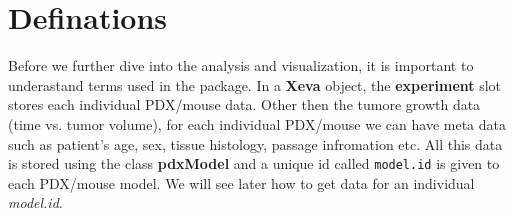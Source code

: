 \documentclass{article}\usepackage[]{graphicx}\usepackage[usenames,dvipsnames]{color}
\begin{document}
\section{Definations}
Before we further dive into the analysis and visualization, it is important to underastand terms used in the  package.
In a \textbf{Xeva} object, the \textbf{experiment} slot stores each individual PDX/mouse data.
Other then the tumore growth data (time vs. tumor volume), for each individual PDX/mouse we can have meta data such as patient's age, sex, tissue histology, passage infromation etc.
All this data is stored using the class \textbf{pdxModel} and a unique id called \texttt{model.id} is given to each PDX/mouse model. We will see later how to get data for an individual \textit{model.id}.
\end{document}
